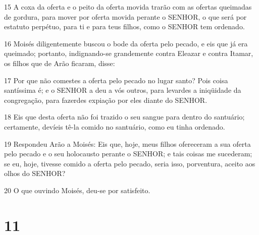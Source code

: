 \par 15 A coxa da oferta e o peito da oferta movida trarão com as ofertas queimadas de gordura, para mover por oferta movida perante o SENHOR, o que será por estatuto perpétuo, para ti e para teus filhos, como o SENHOR tem ordenado.
\par 16 Moisés diligentemente buscou o bode da oferta pelo pecado, e eis que já era queimado; portanto, indignando-se grandemente contra Eleazar e contra Itamar, os filhos que de Arão ficaram, disse:
\par 17 Por que não comestes a oferta pelo pecado no lugar santo? Pois coisa santíssima é; e o SENHOR a deu a vós outros, para levardes a iniqüidade da congregação, para fazerdes expiação por eles diante do SENHOR.
\par 18 Eis que desta oferta não foi trazido o seu sangue para dentro do santuário; certamente, devíeis tê-la comido no santuário, como eu tinha ordenado.
\par 19 Respondeu Arão a Moisés: Eis que, hoje, meus filhos ofereceram a sua oferta pelo pecado e o seu holocausto perante o SENHOR; e tais coisas me sucederam; se eu, hoje, tivesse comido a oferta pelo pecado, seria isso, porventura, aceito aos olhos do SENHOR?
\par 20 O que ouvindo Moisés, deu-se por satisfeito.

\chapter{11}

